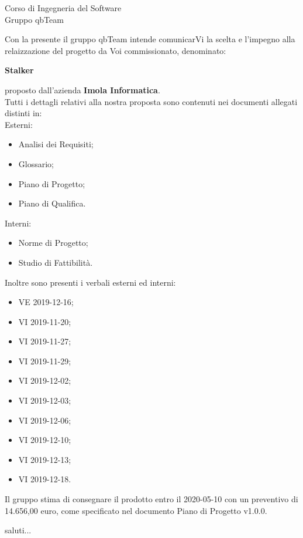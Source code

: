 \documentclass[12pt]{letter}
\begin{document}
\begin{letter}
{            Corso di Ingegneria del Software\\ Gruppo qbTeam
        }
        \opening{ Con la presente il gruppo qbTeam intende comunicarVi la scelta e l'impegno alla relaizzazione del progetto da Voi commissionato, denominato:}
        \begin{center}
            \textbf{Stalker}
        \end{center}
        proposto dall'azienda \textbf{Imola Informatica}.\\
        Tutti i dettagli relativi alla nostra proposta sono contenuti nei documenti allegati distinti in: \\
        Esterni: 
        \begin{itemize}
            \item Analisi dei Requisiti;
            \item Glossario;
            \item Piano di Progetto;
            \item Piano di Qualifica.
        \end{itemize}
        Interni:
        \begin{itemize}
            \item Norme di Progetto;
            \item Studio di Fattibilità.
        \end{itemize}
        Inoltre sono presenti i verbali esterni ed interni:
        \begin{itemize}
            \item VE 2019-12-16;
            \item VI 2019-11-20;
            \item VI 2019-11-27;
            \item VI 2019-11-29;
            \item VI 2019-12-02;
            \item VI 2019-12-03;
            \item VI 2019-12-06;
            \item VI 2019-12-10;
            \item VI 2019-12-13;
            \item VI 2019-12-18.
        \end{itemize}
        Il gruppo stima di consegnare il prodotto entro il 2020-05-10 con un preventivo di 14.656,00 euro, come specificato nel documento Piano di Progetto v1.0.0.
        \closing{saluti...}
        \vspace{10mm}
    \end{letter}
\end{document}
